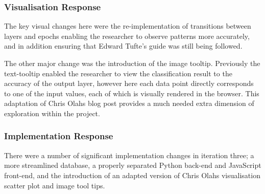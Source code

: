 \documentclass[a4paper,11pt,titlepage]{article}
\begin{document}
		\subsubsection{Visualisation Response}
		The key visual changes here were the re-implementation of transitions between layers and epochs enabling the researcher to observe patterns more accurately, and in addition ensuring that Edward Tufte's guide was still being followed.
		\par 
		The other major change was the introduction of the image tooltip. Previously the text-tooltip enabled the researcher to view the classification result to the accuracy of the output layer, however here each data point directly corresponds to one of the input values, each of which is visually rendered in the browser. This adaptation of Chris Olahs blog post provides a much needed extra dimension of exploration within the project.		
	\subsubsection{Implementation Response}
	There were a number of significant implementation changes in iteration three; a more streamlined database, a properly separated Python back-end and JavaScript front-end, and the introduction of an adapted version of Chris Olahs \cite{Olah2014c} visualisation scatter plot and image tool tips.
	
\end{document}
